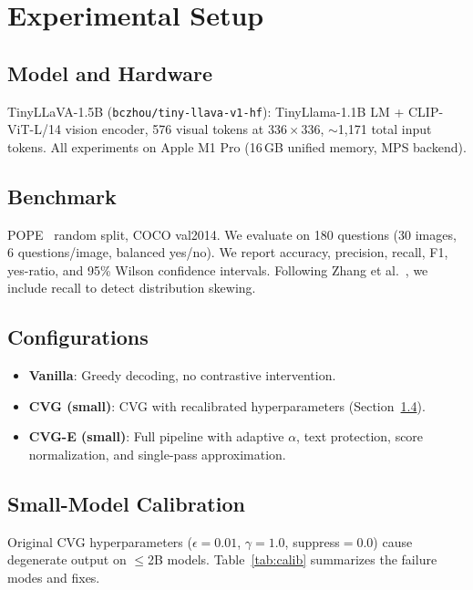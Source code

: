 \documentclass[10pt,twocolumn]{article}
\begin{document}
\section{Experimental Setup}
\label{sec:setup}

\subsection{Model and Hardware}

TinyLLaVA-1.5B (\texttt{bczhou/tiny-llava-v1-hf}): TinyLlama-1.1B LM + CLIP-ViT-L/14 vision encoder, 576 visual tokens at $336\times336$, $\sim$1,171 total input tokens. All experiments on Apple M1 Pro (16\,GB unified memory, MPS backend).

\subsection{Benchmark}

POPE~\cite{li2023pope} random split, COCO val2014. We evaluate on 180 questions (30 images, 6 questions/image, balanced yes/no). We report accuracy, precision, recall, F1, yes-ratio, and 95\% Wilson confidence intervals. Following Zhang et al.~\cite{mirage2025}, we include recall to detect distribution skewing.

\subsection{Configurations}

\begin{itemize}
\item \textbf{Vanilla}: Greedy decoding, no contrastive intervention.
\item \textbf{CVG (small)}: CVG with recalibrated hyperparameters (Section~\ref{sec:calib}).
\item \textbf{CVG-E (small)}: Full pipeline with adaptive $\alpha$, text protection, score normalization, and single-pass approximation.
\end{itemize}

\subsection{Small-Model Calibration}
\label{sec:calib}

Original CVG hyperparameters ($\epsilon{=}0.01$, $\gamma{=}1.0$, suppress${=}0.0$) cause degenerate output on $\leq$2B models. Table~\ref{tab:calib} summarizes the failure modes and fixes.
\end{document}
